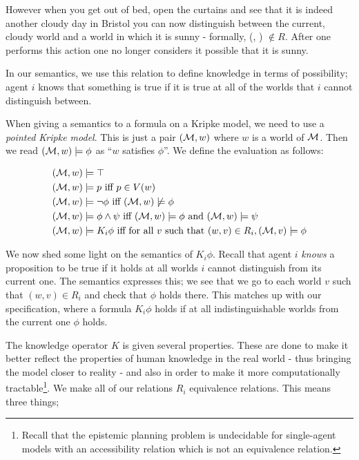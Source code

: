 \documentclass[ %
                    author={Leo Poulson},
                supervisor={Dr. Steven Ramsay},
                    degree={BSc},
                     title={Epistemic Planning for the Dynamic Gossip problem},
                  subtitle={},
                      year={2019} ]{dissertation}
\begin{document}
However when you get out of bed, open the curtains and see that it is indeed
another cloudy day in Bristol you can now distinguish between the current,
cloudy world and a world in which it is sunny - formally, (\Sun, \Cloud) $\not
\in R$. After one performs this action one no longer considers it possible that
it is sunny.

In our semantics, we use this relation to define knowledge in terms of
possibility; agent $i$ knows that something is true if it is true at all of the
worlds that $i$ cannot distinguish between.

When giving a semantics to a formula on a Kripke model, we need to use a
\emph{pointed Kripke model}. This is just a pair $(\mathcal{M}, w)$ where $w$ is a
world of $\mathcal{M}$. Then we read $(\mathcal{M}, w) \models \phi$ as ``$w$ satisfies
$\phi$''. We define the evaluation as follows:

\begin{align*}
  (\mathcal{M}, w) & \models \top \\
  (\mathcal{M}, w) & \models p \text{ iff } p \in V(w) \\
  (\mathcal{M}, w) & \models \neg \phi \text{ iff } (\mathcal{M}, w) \not \models \phi \\
  (\mathcal{M}, w) & \models \phi \land \psi \text{ iff } (\mathcal{M}, w) \models \phi \text{ and } (\mathcal{M}, w) \models \psi \\
  (\mathcal{M}, w) & \models K_i \phi \text{ iff for all $v$ such that } (w, v) \in R_i, (\mathcal{M}, v) \models \phi 
\end{align*}

We now shed some light on the semantics of $K_i \phi$. Recall that agent $i$
\emph{knows} a proposition to be true if it holds at all worlds $i$ cannot
distinguish from its current one. The semantics expresses this; we see that we
go to each world $v$ such that $(w, v) \in R_i$ and check that $\phi$ holds
there. This matches up with our specification, where a formula $K_i \phi$ holds
if at all indistinguishable worlds from the current one $\phi$ holds.

The knowledge operator $K$ is given several properties. These are done to make
it better reflect the properties of human knowledge in the real world - thus
bringing the model closer to reality - and also in order to make it more
computationally tractable\footnote{Recall that the epistemic planning problem is
  undecidable for single-agent models with an accessibility relation which is
  not an equivalence relation.}. We make all of our relations $R_i$ equivalence
relations. This means three things;
\end{document}
